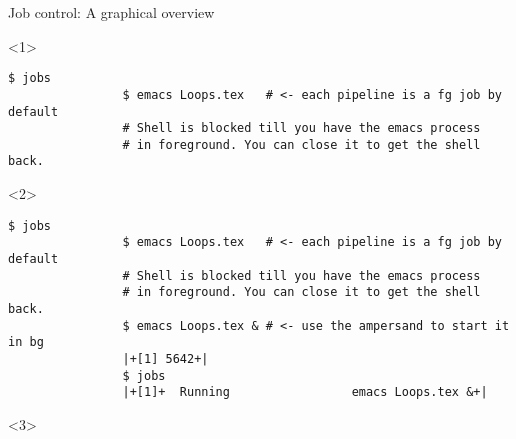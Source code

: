 \begin{frame}[fragile]{Job control: A graphical overview}
\begin{overlayarea}{\textwidth}{0.7\textheight}
\begin{center}
        \end{center}
        \vspace{-2mm}
        \begin{onlyenv}<1>
            \begin{lstlisting}[style=MyBash, xrightmargin=2mm, xleftmargin=2mm]
                $ jobs
                $ emacs Loops.tex   # <- each pipeline is a fg job by default
                # Shell is blocked till you have the emacs process
                # in foreground. You can close it to get the shell back.
            \end{lstlisting}
        \end{onlyenv}
        \begin{onlyenv}<2>
            \begin{lstlisting}[style=MyBash, xrightmargin=2mm, xleftmargin=2mm]
                $ jobs
                $ emacs Loops.tex   # <- each pipeline is a fg job by default
                # Shell is blocked till you have the emacs process
                # in foreground. You can close it to get the shell back.
                $ emacs Loops.tex & # <- use the ampersand to start it in bg
                |+[1] 5642+|
                $ jobs
                |+[1]+  Running                 emacs Loops.tex &+|
            \end{lstlisting}
        \end{onlyenv}
        \begin{onlyenv}<3>
            \begin{lstlisting}[style=MyBash, xrightmargin=2mm, xleftmargin=2mm]

\end{lstlisting}
\end{onlyenv}
\end{overlayarea}
\end{frame}
